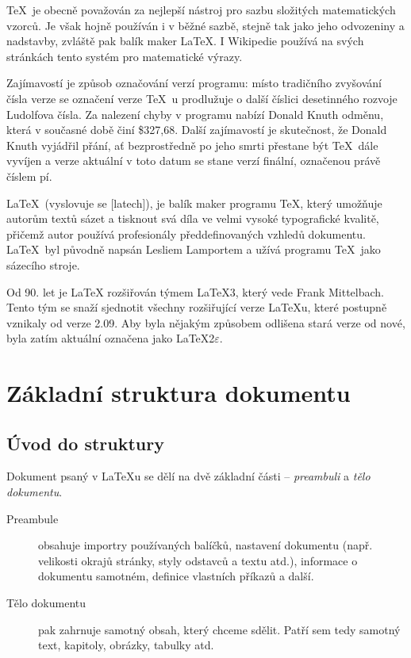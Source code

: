 \documentclass{article}
\begin{document}
\TeX\  je obecně považován za nejlepší nástroj pro sazbu složitých matematických vzorců. Je však hojně používán i v běžné sazbě, stejně tak jako jeho odvozeniny a nadstavby, zvláště pak balík maker \LaTeX. I Wikipedie používá na svých stránkách tento systém pro matematické výrazy.

Zajímavostí je způsob označování verzí programu: místo tradičního zvyšování čísla verze se označení verze \TeX\  u prodlužuje o další číslici desetinného rozvoje Ludolfova čísla. Za nalezení chyby v programu nabízí Donald Knuth odměnu, která v současné době činí \$327,68. Další zajímavostí je skutečnost, že Donald Knuth vyjádřil přání, ať bezprostředně po jeho smrti přestane být \TeX\  dále vyvíjen a verze aktuální v toto datum se stane verzí finální, označenou právě číslem pí.

\LaTeX\  (vyslovuje se [latech]), je balík maker programu \TeX, který umožňuje autorům textů sázet a tisknout svá díla ve velmi vysoké typografické kvalitě, přičemž autor používá profesionály předdefinovaných vzhledů dokumentu. \LaTeX\  byl původně napsán Lesliem Lamportem a užívá programu \TeX\  jako sázecího stroje.

Od 90. let je LaTeX rozšiřován týmem \LaTeX 3, který vede Frank Mittelbach. Tento tým se snaží sjednotit všechny rozšiřující verze \LaTeX u, které postupně vznikaly od verze 2.09. Aby byla nějakým způsobem odlišena stará verze od nové, byla zatím aktuální označena jako \LaTeX 2$\varepsilon$.

\clearpage

\section{Základní struktura dokumentu}
\subsection{Úvod do struktury}

Dokument psaný v \LaTeX u se dělí na dvě základní části -- \emph{preambuli} a \emph{tělo dokumentu}.

\begin{description}
\item[Preambule] obsahuje importry používaných balíčků, nastavení dokumentu (např. velikosti okrajů stránky, styly odstavců a textu atd.), informace o dokumentu samotném, definice vlastních příkazů a další.
\item[Tělo dokumentu] pak zahrnuje samotný obsah, který chceme sdělit. Patří sem tedy samotný text, kapitoly, obrázky, tabulky atd.
\end{description}
\end{document}
